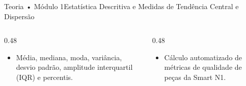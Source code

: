 \begin{senaiframe}{Teoria • Módulo 1}{Estatística Descritiva e Medidas de Tendência Central e Dispersão}
  \begin{columns}[t]
    \begin{column}{0.48\textwidth}
      \begin{tcolorbox}[senaibluecard, title={Fundamentos Teóricos}]
        \begin{itemize}
          \item Média, mediana, moda, variância, desvio padrão, amplitude interquartil (IQR) e percentis.
        \end{itemize}
      \end{tcolorbox}
    \end{column}
    \begin{column}{0.48\textwidth}
      \begin{tcolorbox}[senaigreencard, title={Prática \& Laboratório}]
        \begin{itemize}
          \item Cálculo automatizado de métricas de qualidade de peças da Smart N1.
        \end{itemize}
      \end{tcolorbox}
    \end{column}
  \end{columns}
\end{senaiframe}
